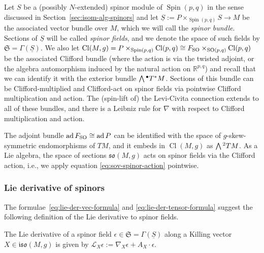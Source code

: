 \documentclass[pdftex]{sigma}
\numberwithin{equation}{section}
\newcommand{\fso}{\mathfrak{so}}
\newcommand{\fiso}{\mathfrak{iso}}
\newcommand{\fS}{\mathfrak{S}}
\newcommand{\RR}{\mathbb{R}}
\newcommand{\eL}{\mathscr{L}}
\newcommand{\Sbundle}{\underline{S}}
\newcommand{\Wedge}{\mathchoice{{\textstyle\bigwedge}}{\bigwedge}{\bigwedge}{\bigwedge}}	%
\newcommand{\1}{\mathbbm{1}}
\DeclareMathOperator{\Spin}{Spin}
\DeclareMathOperator{\SO}{SO}
\DeclareMathOperator{\Cl}{Cl}
\DeclareMathOperator{\ad}{ad}
\begin{document}
Let $S$ be a (possibly $N$-extended) spinor module of $\Spin(p,q)$ in the sense discussed in Section~\ref{sec:isom-alg-spinors} and let $\Sbundle:=P\times_{\Spin(p,q)} S\to M$ be the associated vector bundle over $M$, which we will call the \emph{spinor bundle}. Sections of $\Sbundle$ will be called \emph{spinor fields}, and we denote the space of such fields by $\fS=\Gamma(\Sbundle)$. We also let $\Cl(M,g)=P\times_{\Spin(p,q)}\Cl(p,q)\cong F_{\rm SO}\times_{\SO(p,q)}\Cl(p,q)$ be the associated Clifford bundle (where the action is via the twisted adjoint, or the algebra automorphism induced by the natural action on $\RR^{p,q}$) and recall that we can identify it with the exterior bundle $\Wedge^\bullet T^*M$. Sections of this bundle can be Clifford-multiplied and Clifford-act on spinor fields via pointwise Clifford multiplication and action. The (spin-lift of) the Levi-Civita connection extends to all of these bundles, and there is a Leibniz rule for $\nabla$ with respect to Clifford multiplication and action.

The adjoint bundle $\ad F_{\rm SO}\cong\ad P$ can be identified with the space of $g$-skew-symmetric endomorphisms of $TM$, and it embeds in $\Cl(M,g)$ as $\Wedge^2 TM$. As a Lie algebra, the space of sections $\fso(M,g)$ acts on spinor fields via the Clifford action, i.e., we apply equation \eqref{eq:sov-spinor-action} pointwise.

\subsubsection{Lie derivative of spinors}
\label{sec:lie-der-spinors}

The formulae~\eqref{eq:lie-der-vec-formula} and \eqref{eq:lie-der-tensor-formula} suggest the following definition of the Lie derivative to spinor fields.

\begin{Definition}\label{def:lie-der}
	The Lie derivative of a spinor field $\epsilon\in\fS=\Gamma(\Sbundle)$ along a Killing vector $X\in\fiso(M,g)$ is given by
$
		\eL_X \epsilon := \nabla_X \epsilon + A_X\cdot \epsilon$.
\end{Definition}
\end{document}
